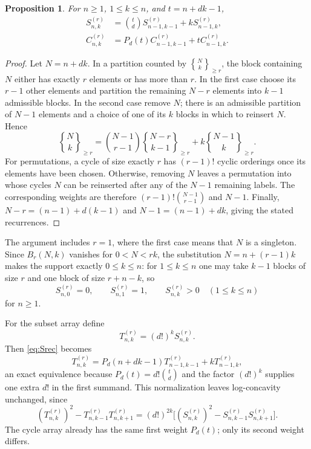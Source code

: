\documentclass[11pt,a4paper]{article}
\numberwithin{equation}{section}
\newtheorem{proposition}[proposition]{Proposition}
\theoremstyle{definition}
\theoremstyle{remark}
\newcommand{\Snum}[3]{S^{(#1)}_{#2,#3}}
\newcommand{\Cnum}[3]{C^{(#1)}_{#2,#3}}
\newcommand{\assocS}[3]{\genfrac\{\}{0pt}{}{#1}{#2}_{\!\ge #3}}
\begin{document}
\begin{proposition}\label{prop:recurrences}
For $n\ge1$, $1\le k\le n$, and $t=n+dk-1$,
\begin{align}
 \Snum r n k
   &=\binom{t}{d}\Snum r {n-1}{k-1}+k\Snum r {n-1}k,
       \label{eq:Srec}\\
 \Cnum r n k
   &=P_d(t)\Cnum r {n-1}{k-1}+t\Cnum r {n-1}k.
       \label{eq:Crec}
\end{align}
\end{proposition}
\begin{proof}
Let $N=n+dk$. In a partition counted by $\assocS Nk r$, the block
containing $N$ either has exactly $r$ elements or has more than $r$.
In the first case choose its $r-1$ other elements and partition the remaining
$N-r$ elements into $k-1$ admissible blocks. In the second case remove $N$;
there is an admissible partition of $N-1$ elements and a choice of one of its
$k$ blocks in which to reinsert $N$. Hence
\[
 \assocS Nk r=\binom{N-1}{r-1}\assocS{N-r}{k-1}r
                 +k\assocS{N-1}kr.
\]
For permutations, a cycle of size exactly $r$ has $(r-1)!$ cyclic
orderings once its elements have been chosen. Otherwise, removing $N$
leaves a permutation into whose cycles $N$ can be reinserted after any
of the $N-1$ remaining labels. The corresponding weights are therefore
$(r-1)!\binom{N-1}{r-1}$ and $N-1$.
Finally,
$N-r=(n-1)+d(k-1)$ and $N-1=(n-1)+dk$, giving the stated recurrences.
\end{proof}

The argument includes $r=1$, where the first case means that $N$ is a
singleton. Since $B_r(N,k)$ vanishes for $0<N<rk$, the substitution
$N=n+(r-1)k$ makes the support exactly $0\le k\le n$: for $1\le k\le n$
one may take $k-1$ blocks of size $r$ and one block of size $r+n-k$, so
\begin{equation}\label{eq:support}
 \Snum r n0=0,\qquad \Snum r n1=1,\qquad \Snum r nk>0\quad(1\le k\le n)
\end{equation}
for $n\ge1$.

For the subset array define
\begin{equation}\label{eq:normalization}
 T^{(r)}_{n,k}=(d!)^k\Snum r n k.
\end{equation}
Then \eqref{eq:Srec} becomes
\begin{equation}\label{eq:Trec}
 T^{(r)}_{n,k}=P_d(n+dk-1)T^{(r)}_{n-1,k-1}
                      +kT^{(r)}_{n-1,k},
\end{equation}
an exact equivalence because $P_d(t)=d!\binom td$ and the factor $(d!)^k$
supplies one extra $d!$ in the first summand.
This normalization leaves log-concavity unchanged, since
\begin{equation}\label{eq:scale-difference}
 (T^{(r)}_{n,k})^2-T^{(r)}_{n,k-1}T^{(r)}_{n,k+1}
  =(d!)^{2k}\bigl[(\Snum r n k)^2-\Snum r n{k-1}\Snum r n{k+1}\bigr].
\end{equation}
The cycle array already has the same first weight $P_d(t)$; only its
second weight differs.
\end{document}
